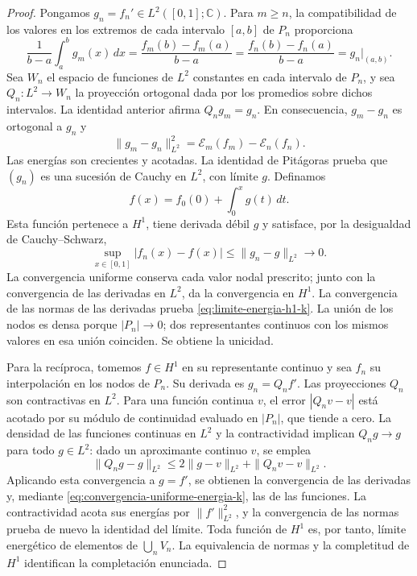 \begin{proof}
Pongamos \(g_n=f_n'\in L^2([0,1];\mathbb C)\). Para
\(m\geq n\), la compatibilidad de los valores en los extremos de cada
intervalo \([a,b]\) de \(P_n\) proporciona
\[
 \frac1{b-a}\int_a^bg_m(x)\,dx
 =\frac{f_m(b)-f_m(a)}{b-a}
 =\frac{f_n(b)-f_n(a)}{b-a}
 =g_n\big|_{(a,b)}.
\]
Sea \(W_n\) el espacio de funciones de \(L^2\) constantes en cada
intervalo de \(P_n\), y sea \(Q_n:L^2\to W_n\) la proyección
ortogonal dada por los promedios sobre dichos intervalos. La identidad
anterior afirma \(Q_ng_m=g_n\). En consecuencia,
\(g_m-g_n\) es ortogonal a \(g_n\) y
\begin{equation}
 \|g_m-g_n\|_{L^2}^2
 =\mathcal E_m(f_m)-\mathcal E_n(f_n).
 \label{eq:pitagoras-gradientes-k}
\end{equation}
Las energías son crecientes y acotadas. La identidad de Pitágoras
prueba que \((g_n)\) es una sucesión de Cauchy en \(L^2\), con
límite \(g\). Definamos
\[
 f(x)=f_0(0)+\int_0^xg(t)\,dt.
\]
Esta función pertenece a \(H^1\), tiene derivada débil \(g\) y
satisface, por la desigualdad de Cauchy--Schwarz,
\begin{equation}
 \sup_{x\in[0,1]}|f_n(x)-f(x)|
 \leq\|g_n-g\|_{L^2}\longrightarrow0.
 \label{eq:convergencia-uniforme-energia-k}
\end{equation}
La convergencia uniforme conserva cada valor nodal prescrito; junto con
la convergencia de las derivadas en \(L^2\), da la convergencia en
\(H^1\). La convergencia de las normas de las derivadas prueba
\eqref{eq:limite-energia-h1-k}. La unión de los nodos es densa porque
\(|P_n|\to0\); dos representantes continuos con los mismos valores
en esa unión coinciden. Se obtiene la unicidad.

Para la recíproca, tomemos \(f\in H^1\) en su representante
continuo y sea \(f_n\) su interpolación en los nodos de \(P_n\).
Su derivada es \(g_n=Q_nf'\). Las proyecciones \(Q_n\) son
contractivas en \(L^2\). Para una función continua \(v\), el
error \(|Q_nv-v|\) está acotado por su módulo de continuidad
evaluado en \(|P_n|\), que tiende a cero. La densidad de las
funciones continuas en \(L^2\) y la contractividad implican
\(Q_ng\to g\) para todo \(g\in L^2\): dado un aproximante
continuo \(v\), se emplea
\[
 \|Q_ng-g\|_{L^2}
 \leq 2\|g-v\|_{L^2}+\|Q_nv-v\|_{L^2}.
\]
Aplicando esta convergencia a \(g=f'\), se obtienen la convergencia
de las derivadas y, mediante \eqref{eq:convergencia-uniforme-energia-k},
las de las funciones. La contractividad acota sus energías por
\(\|f'\|_{L^2}^2\), y la convergencia de las normas prueba de
nuevo la identidad del límite. Toda función de \(H^1\) es, por
tanto, límite energético de elementos de \(\bigcup_nV_n\).
La equivalencia de normas y la completitud de \(H^1\) identifican
la completación enunciada.
\end{proof}

